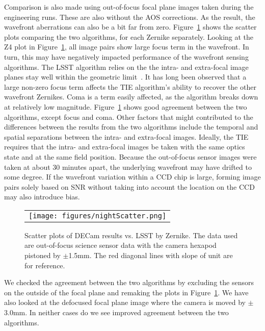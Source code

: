 \documentclass[]{spie}  %
\begin{document}
Comparison is also made using out-of-focus focal plane images taken during the engineering runs.
These are also without the AOS corrections. As the result, the wavefront aberrations can also be a bit far from zero. Figure~\ref{fig:nightScatter} shows the scatter plots comparing the two algorithms, for each Zernike separately. Looking at the Z4 plot in Figure~\ref{fig:nightScatter}, all image pairs show large focus term in the wavefront. In turn, this may have negatively impacted performance of the wavefront sensing algorithms.
The LSST algorithm relies on the the intra- and extra-focal image planes stay well within the geometric limit~\cite{lsstcwfs}.
It has long been observed that a large non-zero focus term affects the TIE algorithm's ability to recover the other wavefront Zernikes.
Coma is a term easily affected, as the algorithm breaks down at relatively low magnitude.
Figure~\ref{fig:nightScatter} shows good agreement between the two algorithms, except focus and coma.
Other factors that might contributed to the differences between the results from the two algorithms include the temporal and spatial separations between the intra- and extra-focal images.
Ideally, the TIE requires that the intra- and extra-focal images be taken with the same optics state and at the same field position.
Because the out-of-focus sensor images were taken at about 30 minutes apart, the underlying wavefront may have drifted to some degree.
If the wavefront variation within a CCD chip is large, forming image pairs solely based on SNR without taking into account the location on the CCD may also introduce bias.

   \begin{figure} [tbph]
   \begin{center}
   \begin{tabular}{c} %
   \texttt{[image: figures/nightScatter.png]}
   \end{tabular}
   \end{center}
   \caption[example] 
   { \label{fig:nightScatter} 
Scatter plots of DECam results vs. LSST by Zernike. The data used are out-of-focus science sensor data with the camera hexapod pistoned by $\pm$1.5mm. The red diagonal lines with slope of unit are for reference.
}
   \end{figure} 

We checked the agreement between the two algorithms by excluding the sensors on the outside of the focal plane and remaking the plots in Figure~\ref{fig:nightScatter}. 
We have also looked at the defocused focal plane image where the camera is moved by $\pm$3.0mm.
In neither cases do we see improved agreement between the two algorithms.
\end{document}
